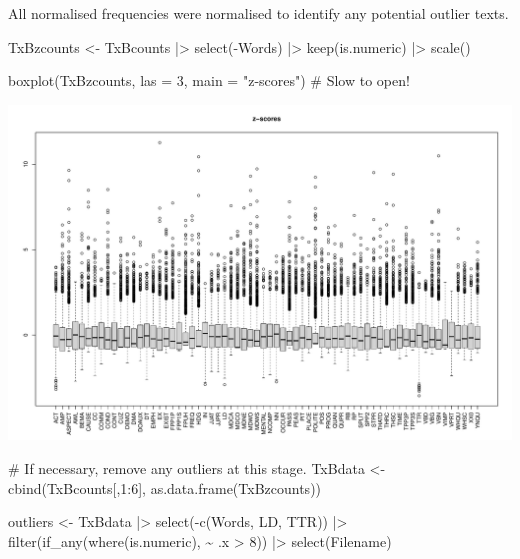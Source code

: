 \documentclass[
  letterpaper,
  DIV=11,
  numbers=noendperiod]{scrreprt}
\newenvironment{Shaded}{\begin{snugshade}}{\end{snugshade}}
\newcommand{\AttributeTok}[1]{\textcolor[rgb]{0.40,0.45,0.13}{#1}}
\newcommand{\CommentTok}[1]{\textcolor[rgb]{0.37,0.37,0.37}{#1}}
\newcommand{\DecValTok}[1]{\textcolor[rgb]{0.68,0.00,0.00}{#1}}
\newcommand{\FunctionTok}[1]{\textcolor[rgb]{0.28,0.35,0.67}{#1}}
\newcommand{\NormalTok}[1]{\textcolor[rgb]{0.00,0.23,0.31}{#1}}
\newcommand{\OtherTok}[1]{\textcolor[rgb]{0.00,0.23,0.31}{#1}}
\newcommand{\SpecialCharTok}[1]{\textcolor[rgb]{0.37,0.37,0.37}{#1}}
\newcommand{\StringTok}[1]{\textcolor[rgb]{0.13,0.47,0.30}{#1}}
\begin{document}
All normalised frequencies were normalised to identify any potential
outlier texts.

\begin{Shaded}
\begin{Highlighting}[]
\NormalTok{TxBzcounts }\OtherTok{\textless{}{-}}\NormalTok{ TxBcounts }\SpecialCharTok{|\textgreater{}} 
  \FunctionTok{select}\NormalTok{(}\SpecialCharTok{{-}}\NormalTok{Words) }\SpecialCharTok{|\textgreater{}}  
  \FunctionTok{keep}\NormalTok{(is.numeric) }\SpecialCharTok{|\textgreater{}}  
  \FunctionTok{scale}\NormalTok{()}

\FunctionTok{boxplot}\NormalTok{(TxBzcounts, }\AttributeTok{las =} \DecValTok{3}\NormalTok{, }\AttributeTok{main =} \StringTok{"z{-}scores"}\NormalTok{) }\CommentTok{\# Slow to open!}
\end{Highlighting}
\end{Shaded}

\includegraphics{AppendixE_files/figure-pdf/z-standardisation-outliers-1.pdf}

\begin{Shaded}
\begin{Highlighting}[]
\CommentTok{\# If necessary, remove any outliers at this stage.}
\NormalTok{TxBdata }\OtherTok{\textless{}{-}} \FunctionTok{cbind}\NormalTok{(TxBcounts[,}\DecValTok{1}\SpecialCharTok{:}\DecValTok{6}\NormalTok{], }\FunctionTok{as.data.frame}\NormalTok{(TxBzcounts))}

\NormalTok{outliers }\OtherTok{\textless{}{-}}\NormalTok{ TxBdata }\SpecialCharTok{|\textgreater{}}  
  \FunctionTok{select}\NormalTok{(}\SpecialCharTok{{-}}\FunctionTok{c}\NormalTok{(Words, LD, TTR)) }\SpecialCharTok{|\textgreater{}}  
  \FunctionTok{filter}\NormalTok{(}\FunctionTok{if\_any}\NormalTok{(}\FunctionTok{where}\NormalTok{(is.numeric), }\SpecialCharTok{\textasciitilde{}}\NormalTok{ .x }\SpecialCharTok{\textgreater{}} \DecValTok{8}\NormalTok{)) }\SpecialCharTok{|\textgreater{}}  
  \FunctionTok{select}\NormalTok{(Filename)}
\end{Highlighting}
\end{Shaded}
\end{document}
